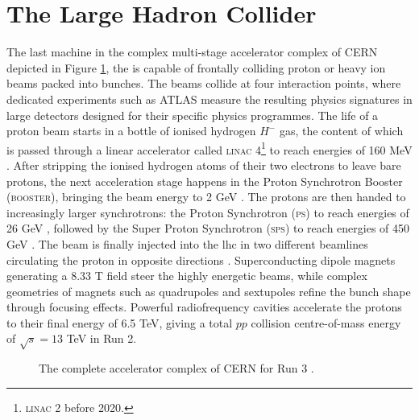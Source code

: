 \section{The Large Hadron Collider}\label{sec-LHC}
The last machine in the complex multi-stage accelerator complex of CERN depicted in Figure \ref{fig-CernAccSys}, the  is capable of frontally colliding proton or heavy ion beams packed into bunches. The beams collide at four interaction points, where dedicated experiments such as ATLAS measure the resulting physics signatures in large detectors designed for their specific physics programmes. The life of a proton beam starts in a bottle of ionised hydrogen $H^-$ gas, the content of which is passed through a linear accelerator called \textsc{linac} 4\footnote{\textsc{linac} 2 before 2020.} to reach energies of 160 MeV \cite{Vretenar:2020quc}. After stripping the ionised hydrogen atoms of their two electrons to leave bare protons, the next acceleration stage happens in the Proton Synchrotron Booster (\textsc{booster}), bringing the beam energy to 2 GeV \cite{Reich:1969fw}. The protons are then handed to increasingly larger synchrotrons: the Proton Synchrotron (\textsc{ps}) to reach energies of 26 GeV \cite{CERNPS}, followed by the Super Proton Synchrotron (\textsc{sps}) to reach energies of 450 GeV \cite{Synchrotron:1997188}. The beam is finally injected into the \gls{lhc} in two different beamlines circulating the proton in opposite directions \cite{Evans:2008zzb}. Superconducting dipole magnets generating a 8.33 T field steer the highly energetic beams, while complex geometries of magnets such as quadrupoles and sextupoles refine the bunch shape through focusing effects. Powerful radiofrequency cavities accelerate the protons to their final energy of 6.5 TeV, giving a total $pp$ collision centre-of-mass energy of $\sqrt{s} = 13$ TeV in Run 2. 

\begin{figure}[!h]
  \centering
  \caption{The complete accelerator complex of CERN for Run 3 \cite{CERNAcc}.}
  \label{fig-CernAccSys}
\end{figure}

